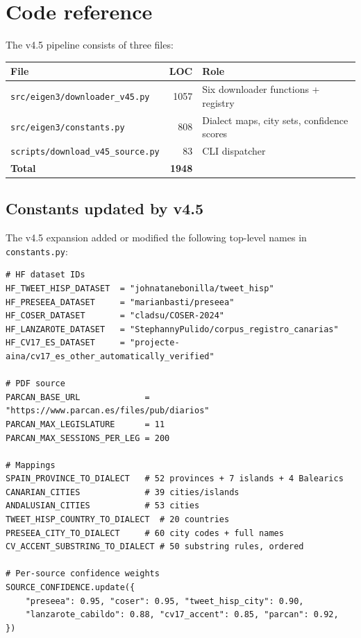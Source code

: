 \documentclass[11pt,a4paper]{article}
\begin{document}
\appendix
\section{Code reference}

The v4.5 pipeline consists of three files:

\begin{center}
\begin{tabular}{l r l}
\toprule
\textbf{File} & \textbf{LOC} & \textbf{Role} \\
\midrule
\texttt{src/eigen3/downloader\_v45.py} & 1057 & Six downloader functions + registry \\
\texttt{src/eigen3/constants.py}        &  808 & Dialect maps, city sets, confidence scores \\
\texttt{scripts/download\_v45\_source.py} &  83 & CLI dispatcher \\
\midrule
\textbf{Total} & \textbf{1948} & \\
\bottomrule
\end{tabular}
\end{center}

\subsection{Constants updated by v4.5}

The v4.5 expansion added or modified the following top-level names in
\texttt{constants.py}:

\begin{lstlisting}[style=pycode]
# HF dataset IDs
HF_TWEET_HISP_DATASET  = "johnatanebonilla/tweet_hisp"
HF_PRESEEA_DATASET     = "marianbasti/preseea"
HF_COSER_DATASET       = "cladsu/COSER-2024"
HF_LANZAROTE_DATASET   = "StephannyPulido/corpus_registro_canarias"
HF_CV17_ES_DATASET     = "projecte-aina/cv17_es_other_automatically_verified"

# PDF source
PARCAN_BASE_URL             = "https://www.parcan.es/files/pub/diarios"
PARCAN_MAX_LEGISLATURE      = 11
PARCAN_MAX_SESSIONS_PER_LEG = 200

# Mappings
SPAIN_PROVINCE_TO_DIALECT   # 52 provinces + 7 islands + 4 Balearics
CANARIAN_CITIES             # 39 cities/islands
ANDALUSIAN_CITIES           # 53 cities
TWEET_HISP_COUNTRY_TO_DIALECT  # 20 countries
PRESEEA_CITY_TO_DIALECT     # 60 city codes + full names
CV_ACCENT_SUBSTRING_TO_DIALECT # 50 substring rules, ordered

# Per-source confidence weights
SOURCE_CONFIDENCE.update({
    "preseea": 0.95, "coser": 0.95, "tweet_hisp_city": 0.90,
    "lanzarote_cabildo": 0.88, "cv17_accent": 0.85, "parcan": 0.92,
})
\end{lstlisting}
\end{document}
